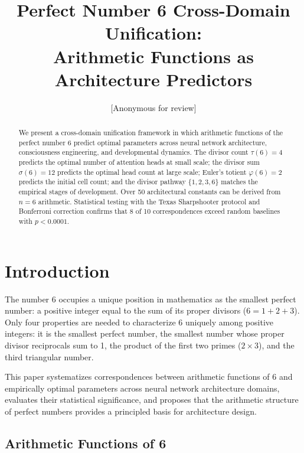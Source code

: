 \documentclass[12pt]{article}
\title{Perfect Number 6 Cross-Domain Unification:\\Arithmetic Functions as Architecture Predictors}
\author{[Anonymous for review]}
\date{}
\begin{document}
\maketitle

\begin{abstract}
We present a cross-domain unification framework in which arithmetic functions of the perfect number 6 predict optimal parameters across neural network architecture, consciousness engineering, and developmental dynamics. The divisor count $\tau(6) = 4$ predicts the optimal number of attention heads at small scale; the divisor sum $\sigma(6) = 12$ predicts the optimal head count at large scale; Euler's totient $\varphi(6) = 2$ predicts the initial cell count; and the divisor pathway $\{1, 2, 3, 6\}$ matches the empirical stages of development. Over 50 architectural constants can be derived from $n = 6$ arithmetic. Statistical testing with the Texas Sharpshooter protocol and Bonferroni correction confirms that 8 of 10 correspondences exceed random baselines with $p < 0.0001$.
\end{abstract}

\section{Introduction}

The number 6 occupies a unique position in mathematics as the smallest perfect number: a positive integer equal to the sum of its proper divisors ($6 = 1 + 2 + 3$). Only four properties are needed to characterize 6 uniquely among positive integers: it is the smallest perfect number, the smallest number whose proper divisor reciprocals sum to 1, the product of the first two primes ($2 \times 3$), and the third triangular number.

This paper systematizes correspondences between arithmetic functions of 6 and empirically optimal parameters across neural network architecture domains, evaluates their statistical significance, and proposes that the arithmetic structure of perfect numbers provides a principled basis for architecture design.

\subsection{Arithmetic Functions of 6}
\end{document}
